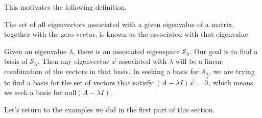 \documentclass{ximera}
\begin{document}
This motivates the following definition.

\begin{definition}\label{def:eigspace}
The set of all eigenvectors associated with a given eigenvalue of a matrix, together with the zero vector, is known as the  associated with that eigenvalue.
\end{definition}

Given an eigenvalue $\lambda$, there is an associated eigenspace $\mathcal{S}_{\lambda}$. Our goal is to find a basis of $\mathcal{S}_{\lambda}$.  Then any eigenvector $\vec{x}$ associated with $\lambda$ will be a linear combination of the vectors in that basis.  In seeking a basis for $\mathcal{S}_{\lambda}$, we are trying to find a basis for the set of vectors that satisfy $(A-\lambda I) \vec{x}=\vec{0}$, which means we seek a basis for $\mbox{null}(A-\lambda I)$. %

Let's return to the examples we did in the first part of this section.
\end{document}
